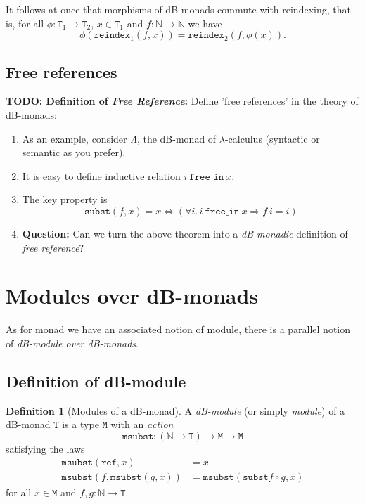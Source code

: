 \documentclass[a4paper,twoside,12pt]{article}
\theoremstyle{definition}
\newtheorem{definition}{Definition}
\theoremstyle{remark}
\newcommand{\NN}{\mathbb{N}}
\newcommand{\subst}{\mathtt{subst}}
\newcommand{\refe}{\mathtt{ref}}
\newcommand{\reindex}{\mathtt{reindex}}
\newcommand{\TT}{\mathtt{T}}
\newcommand{\MM}{\mathtt{M}}
\newcommand{\msubst}{\mathtt{msubst}}
\begin{document}
It follows at once that morphisms of dB-monads commute with
reindexing, that is, for all $\phi\colon \TT_1 \to \TT_2$,
$x\in \TT_1$ and $f\colon \NN\to \NN$ we have
\begin{equation*}
  \phi(\reindex_1(f,x)) = \reindex_2(f,\phi(x)) .
\end{equation*}

\subsection{Free references}
\label{sec:free-references}

\textbf{TODO: Definition of \emph{Free Reference}:}
Define 'free references' in the theory of dB-monads:
\begin{enumerate}
\item As an example, consider $\Lambda$, the dB-monad of
  $\lambda$-calculus (syntactic or semantic as you prefer).
\item It is easy to define inductive relation
  $i\ \mathtt{free\_in}\ x$.
\item The key property is
  \begin{equation*}
    \subst(f,x) = x \Longleftrightarrow
    (\forall i.\, i\ \mathtt{free\_in}\ x \Longrightarrow f\ i = i)
  \end{equation*}
\item \textbf{Question:} Can we turn the above theorem into a
  \emph{dB-monadic} definition of \emph{free reference}?
\end{enumerate}

\section{Modules over dB-monads}
\label{sec:modules}

As for monad we have an associated notion of module, there is a
parallel notion of \emph{dB-module over dB-monads}.

\subsection{Definition of dB-module}
\label{sec:definition-module}

\begin{definition}[Modules of a dB-monad]
  A \emph{dB-module} (or simply \emph{module}) of a dB-monad $\TT$ is
  a type $\MM$ with an \emph{action}
  \begin{equation*}
    \msubst\colon (\NN\to \TT) \to \MM \to \MM
  \end{equation*}
  satisfying the laws
  \begin{align*}
    \msubst(\refe,x) &= x\\
    \msubst(f,\msubst(g,x)) &= \msubst(\subst f \circ g, x)
  \end{align*}
  for all $x\in \MM$ and $f,g\colon \NN \to \TT$.
\end{definition}
\end{document}
